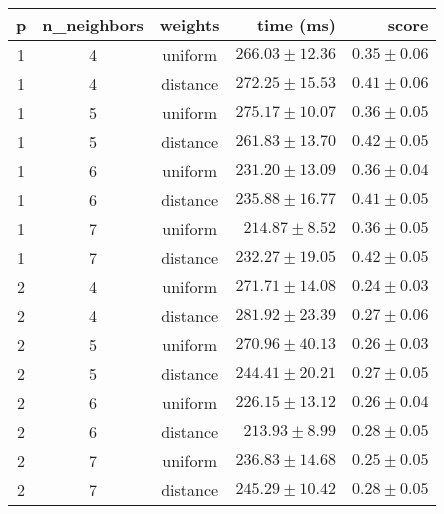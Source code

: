 \begin{tabular}{cccrr}
\toprule
\textbf{p} & \textbf{n\_neighbors} & \textbf{weights} & \textbf{time (ms)} & \textbf{score}\\
\midrule
1 & 4 & uniform & $266.03 \pm 12.36$ & $0.35 \pm 0.06$\\
1 & 4 & distance & $272.25 \pm 15.53$ & $0.41 \pm 0.06$\\
1 & 5 & uniform & $275.17 \pm 10.07$ & $0.36 \pm 0.05$\\
1 & 5 & distance & $261.83 \pm 13.70$ & $0.42 \pm 0.05$\\
1 & 6 & uniform & $231.20 \pm 13.09$ & $0.36 \pm 0.04$\\
1 & 6 & distance & $235.88 \pm 16.77$ & $0.41 \pm 0.05$\\
1 & 7 & uniform & $214.87 \pm 8.52$ & $0.36 \pm 0.05$\\
1 & 7 & distance & $232.27 \pm 19.05$ & $0.42 \pm 0.05$\\
2 & 4 & uniform & $271.71 \pm 14.08$ & $0.24 \pm 0.03$\\
2 & 4 & distance & $281.92 \pm 23.39$ & $0.27 \pm 0.06$\\
2 & 5 & uniform & $270.96 \pm 40.13$ & $0.26 \pm 0.03$\\
2 & 5 & distance & $244.41 \pm 20.21$ & $0.27 \pm 0.05$\\
2 & 6 & uniform & $226.15 \pm 13.12$ & $0.26 \pm 0.04$\\
2 & 6 & distance & $213.93 \pm 8.99$ & $0.28 \pm 0.05$\\
2 & 7 & uniform & $236.83 \pm 14.68$ & $0.25 \pm 0.05$\\
2 & 7 & distance & $245.29 \pm 10.42$ & $0.28 \pm 0.05$\\
\bottomrule
\end{tabular}
